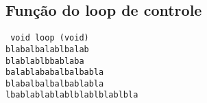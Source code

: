 \subsection{Função do loop de controle}
\label{sec:loop}

\texttt{
void loop (void)\\
blabalbalablbalab\\
blablablbbablaba\\
balablababalbalbabla\\
blabalbalbalbablabla\\
lbablablablablblablblablbla\\}
